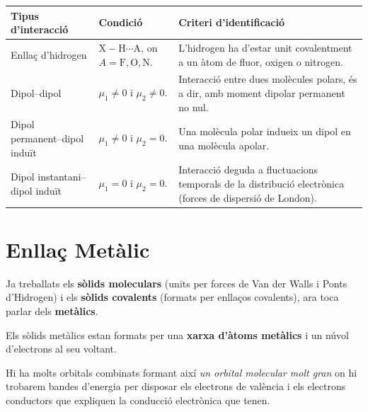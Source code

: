 \documentclass[12pt]{article}
\begin{document}
\begin{center}
    \begin{table}[ht]
    \centering
    \renewcommand{\arraystretch}{1.6}
    \begin{tabular}{|l|p{4.8cm}|p{5.3cm}|}
        \hline
        \textbf{Tipus d'interacció} &
        \textbf{Condició} &
        \textbf{Criteri d'identificació} \\
        \hline

        Enllaç d'hidrogen &
        \(\mathrm{X-H\cdots A}\), on
        \(A = \mathrm{F, O, N}\). &
        L'hidrogen ha d'estar unit
        covalentment a un àtom de fluor,
        oxigen o nitrogen. \\
        \hline

        Dipol--dipol &
        \(\mu_1 \neq 0\) i \(\mu_2 \neq 0\). &
        Interacció entre dues molècules
        polars, és a dir, amb moment dipolar
        permanent no nul. \\
        \hline

        Dipol permanent--dipol induït &
        \(\mu_1 \neq 0\) i \(\mu_2 = 0\). &
        Una molècula polar indueix un dipol
        en una molècula apolar. \\
        \hline

        Dipol instantani--dipol induït &
        \(\mu_1 = 0\) i \(\mu_2 = 0\). &
        Interacció deguda a fluctuacions
        temporals de la distribució
        electrònica (forces de dispersió
        de London). \\
        \hline

    \end{tabular}
\end{table}
\end{center}

\section{Enllaç Metàlic}

Ja treballats els \textbf{sòlids moleculars} (units per forces de Van der Walls i Ponts d'Hidrogen) i els \textbf{sòlids covalents} (formats per enllaços covalents), ara toca parlar dels \textbf{metàlics}.

Els sòlids metàlics estan formats per una \textbf{xarxa d'àtoms metàlics} i un núvol d'electrons al seu voltant.

Hi ha molts orbitals combinats formant així \textit{un orbital molecular molt gran} on hi trobarem bandes d'energia per disposar els electrons de valència i els electrons conductors que expliquen la conducció electrònica que tenen.
\end{document}

